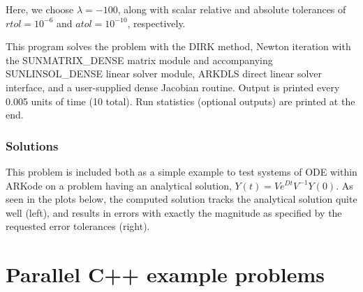 \documentclass[letterpaper,10pt,english]{sphinxmanual}
\begin{document}
Here, we choose \(\lambda = -100\), along with scalar relative and
absolute tolerances of \(rtol=10^{-6}\) and \(atol=10^{-10}\),
respectively.

This program solves the problem with the DIRK method,
Newton iteration with the SUNMATRIX\_DENSE matrix module and
accompanying SUNLINSOL\_DENSE linear solver module, ARKDLS direct
linear solver interface, and a user-supplied dense Jacobian
routine.  Output is printed every 0.005 units of time (10 total).
Run statistics (optional outputs) are printed at the end.


\subsection{Solutions}
\label{\detokenize{cpp_serial:solutions}}
This problem is included both as a simple example to test systems of
ODE within ARKode on a problem having an analytical solution,
\(Y(t) = V e^{Dt} V^{-1} Y(0)\).  As seen in the plots below, the
computed solution tracks the analytical solution quite well (left),
and results in errors with exactly the magnitude as specified by the
requested error tolerances (right).

\noindent{}

\noindent{}


\chapter{Parallel C++ example problems}
\label{\detokenize{cpp_parallel::doc}}\label{\detokenize{cpp_parallel:parallel-c-example-problems}}\label{\detokenize{cpp_parallel:parallel-cpp}}
\end{document}
